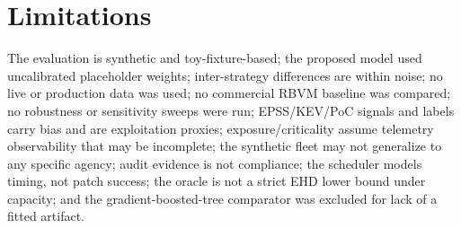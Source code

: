 \section{Limitations}

The evaluation is synthetic and toy-fixture-based; the proposed model used
uncalibrated placeholder weights; inter-strategy differences are within noise; no
live or production data was used; no commercial RBVM baseline was compared; no
robustness or sensitivity sweeps were run; EPSS/KEV/PoC signals and labels carry
bias and are exploitation proxies; exposure/criticality assume telemetry
observability that may be incomplete; the synthetic fleet may not generalize to any
specific agency; audit evidence is not compliance; the scheduler models timing, not
patch success; the oracle is not a strict EHD lower bound under capacity; and the
gradient-boosted-tree comparator was excluded for lack of a fitted artifact.
